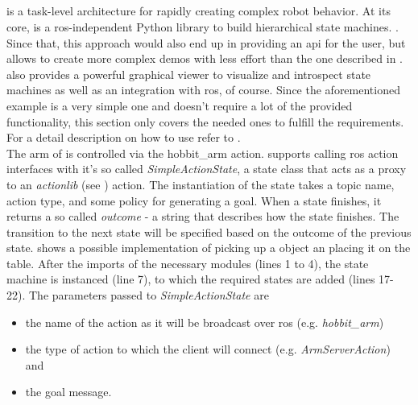 \begin{figure}[htbp]
	
\end{figure}

\subsection{\smach{}}
\smach{} is a task-level architecture for rapidly creating complex robot behavior. At its core, \smach{} is a \gls{ros}-independent Python library to build hierarchical state machines. \cite{SmachROS}. Since that, this approach would also end up in providing an \gls{api} for the user, but allows to create more complex demos with less effort than the one described in . \smach{} also provides a powerful graphical viewer to visualize and introspect state machines as well as an integration with \gls{ros}, of course. Since the aforementioned example is a very simple one and doesn't require a lot of the provided \smach{} functionality, this section only covers the needed ones to fulfill the requirements. For a detail description on how to use \smach{} refer to \cite{SmachROS}. \\

The arm of \hobbit{} is controlled via the hobbit\_arm action. \smach{} supports calling \gls{ros} action interfaces with it's so called \textit{SimpleActionState}, a state class that acts as a proxy to an \textit{actionlib} (see ) action. The instantiation of the state takes a topic name, action type, and some policy for generating a goal. When a state finishes, it returns a so called \textit{outcome} - a string that describes how the state finishes. The transition to the next state will be specified based on the outcome of the previous state.  shows a possible implementation of picking up a object an placing it on the table. After the imports of the necessary modules (lines 1 to 4), the state machine is instanced (line 7), to which the required states are added (lines 17-22). The parameters passed to \textit{SimpleActionState} are

\begin{itemize}
	\item the name of the action as it will be broadcast over \gls{ros} (e.g. \textit{hobbit\_arm})
	\item the type of action to which the client will connect (e.g. \textit{ArmServerAction}) and
	\item the goal message.
\end{itemize}

